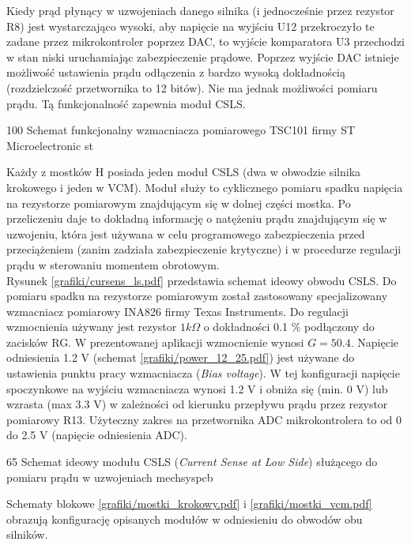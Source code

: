 Kiedy prąd płynący w uzwojeniach danego silnika (i jednocześnie przez rezystor R8) jest wystarczająco wysoki, aby napięcie na wyjściu U12 przekroczyło te zadane przez mikrokontroler poprzez DAC, to wyjście komparatora U3 przechodzi w stan niski uruchamiając zabezpieczenie prądowe. Poprzez wyjście DAC istnieje możliwość ustawienia prądu odłączenia z bardzo wysoką dokładnością (rozdzielczość przetwornika to 12 bitów). Nie ma jednak możliwości pomiaru prądu. Tą funkcjonalność zapewnia moduł CSLS.

	{100}
	{Schemat funkcjonalny wzmacniacza pomiarowego TSC101 firmy ST Microelectronic}
	{st}


Każdy z mostków H posiada jeden moduł CSLS (dwa w obwodzie silnika krokowego i jeden w VCM). Moduł służy to cyklicznego pomiaru spadku napięcia na rezystorze pomiarowym znajdującym się w dolnej części mostka. Po przeliczeniu daje to dokładną informację o natężeniu prądu znajdującym się w uzwojeniu, która jest używana w celu programowego zabezpieczenia przed przeciążeniem (zanim zadziała zabezpieczenie krytyczne) i w procedurze regulacji prądu w sterowaniu momentem obrotowym. \\

Rysunek \ref{grafiki/cursens_ls.pdf} przedstawia schemat ideowy obwodu CSLS. Do pomiaru spadku na rezystorze pomiarowym został zastosowany specjalizowany wzmacniacz pomiarowy INA826 firmy Texas Instruments. Do regulacji wzmocnienia używany jest rezystor $ 1 k\Omega $ o dokładności 0.1 \% podłączony do zacisków RG. W prezentowanej aplikacji wzmocnienie wynosi $ G = 50.4 $. Napięcie odniesienia 1.2 V (schemat \ref{grafiki/power_12_25.pdf}) jest używane do ustawienia punktu pracy wzmacniacza ({\it Bias voltage}). W tej konfiguracji napięcie spoczynkowe na wyjściu wzmacniacza wynosi 1.2 V i obniża się (min. 0 V) lub wzrasta (max 3.3 V) w zależności od kierunku przepływu prądu przez rezystor pomiarowy R13. Użyteczny zakres na przetwornika ADC mikrokontrolera to od 0 do 2.5 V (napięcie odniesienia ADC).

	{65}
	{Schemat ideowy modułu CSLS ({\it Current Sense at Low Side}) służącego do pomiaru prądu w uzwojeniach}
	{mechsyspcb}
	
Schematy blokowe \ref{grafiki/mostki_krokowy.pdf} i \ref{grafiki/mostki_vcm.pdf} obrazują konfigurację opisanych modułów w odniesieniu do obwodów obu silników.

